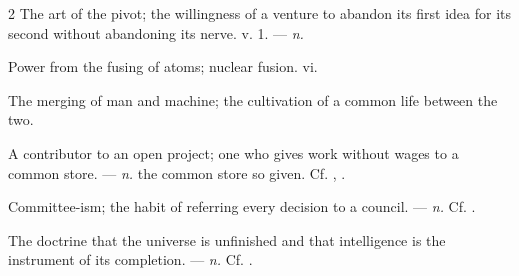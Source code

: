\begin{multicols}{2}
 The art of the pivot; the willingness of a venture to abandon its first idea for its second without abandoning its nerve.   v. 1. —  \textit{n.}

 Power from the fusing of atoms; nuclear fusion.   vi.

 The merging of man and machine; the cultivation of a common life between the two.

 A contributor to an open project; one who gives work without wages to a common store. —  \textit{n.} the common store so given. Cf. , .

 Committee-ism; the habit of referring every decision to a council. —  \textit{n.} Cf. .

 The doctrine that the universe is unfinished and that intelligence is the instrument of its completion. —  \textit{n.} Cf. .

\end{multicols}

